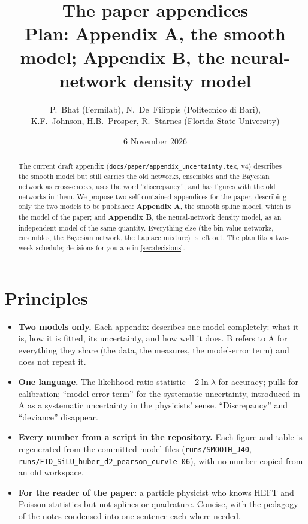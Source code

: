 \documentclass[11pt]{article}
\title{\textbf{The paper appendices}\\[4pt]
\large Plan: Appendix A, the smooth model; Appendix B, the neural-network density model}
\author{P.~Bhat (Fermilab), N.~De~Filippis (Politecnico di Bari),\\
K.F.~Johnson, H.B.~Prosper, R.~Starnes (Florida State University)}
\date{6 November 2026}
\newcommand{\file}[1]{\nolinkurl{#1}}
\begin{document}
\maketitle

\begin{abstract}
\noindent
The current draft appendix (\file{docs/paper/appendix_uncertainty.tex}, v4) describes the smooth model
but still carries the old networks, ensembles and the Bayesian network as cross-checks, uses the word
``discrepancy'', and has figures with the old networks in them. We propose two self-contained
appendices for the paper, describing only the two models to be published: \textbf{Appendix A}, the
smooth spline model, which is the model of the paper; and \textbf{Appendix B}, the neural-network
density model, as an independent model of the same quantity. Everything else (the bin-value networks,
ensembles, the Bayesian network, the Laplace mixture) is left out. The plan fits a two-week schedule;
decisions for you are in \cref{sec:decisions}.
\end{abstract}

\tableofcontents

\section{Principles}

\begin{itemize}
  \item \textbf{Two models only.} Each appendix describes one model completely: what it is, how it is
    fitted, its uncertainty, and how well it does. B refers to A for everything they share (the data,
    the measures, the model-error term) and does not repeat it.
  \item \textbf{One language.} The likelihood-ratio statistic $-2\ln\lambda$ for accuracy; pulls for
    calibration; ``model-error term'' for the systematic uncertainty, introduced in A as a systematic
    uncertainty in the physicists' sense. ``Discrepancy'' and ``deviance'' disappear.
  \item \textbf{Every number from a script in the repository.} Each figure and table is regenerated
    from the committed model files (\file{runs/SMOOTH_J40}, \file{runs/FTD_SiLU_huber_d2_pearson_curv1e-06}),
    with no number copied from an old workspace.
  \item \textbf{For the reader of the paper}: a particle physicist who knows HEFT and Poisson statistics
    but not splines or quadrature. Concise, with the pedagogy of the notes condensed into one sentence
    each where needed.
\end{itemize}
\end{document}
